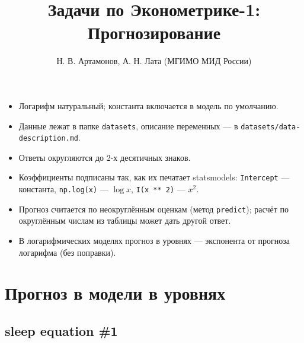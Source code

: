 \documentclass[
  russian,
]{article}
\title{Задачи по Эконометрике-1: Прогнозирование}
\author{Н. В. Артамонов, А. Н. Лата (МГИМО МИД России)}
\date{}
\providecommand{\tightlist}{%
  \setlength{\itemsep}{0pt}\setlength{\parskip}{0pt}}
\renewcommand*\contentsname{Содержание}
\newcommand\contentsname{Содержание}
\begin{document}
\maketitle

\renewcommand*\contentsname{Содержание}
{
\setcounter{tocdepth}{3}
\tableofcontents
}

\begin{tcolorbox}[enhanced jigsaw, arc=.35mm, bottomrule=.15mm, bottomtitle=1mm, breakable, colback=white, colbacktitle=quarto-callout-important-color!10!white, colframe=quarto-callout-important-color-frame, coltitle=black, left=2mm, leftrule=.75mm, opacityback=0, opacitybacktitle=0.6, rightrule=.15mm, title=\textcolor{quarto-callout-important-color}{\faExclamation}\hspace{0.5em}{Важно}, titlerule=0mm, toprule=.15mm, toptitle=1mm]

\begin{itemize}
\tightlist
\item
  Логарифм натуральный; константа включается в модель по умолчанию.
\item
  Данные лежат в папке \texttt{datasets}, описание переменных --- в
  \texttt{datasets/data-description.md}.
\item
  Ответы округляются до 2-х десятичных знаков.
\item
  Коэффициенты подписаны так, как их печатает statsmodels:
  \texttt{Intercept} --- константа, \texttt{np.log(x)} --- \(\log x\),
  \texttt{I(x\ **\ 2)} --- \(x^2\).
\item
  Прогноз считается по неокруглённым оценкам (метод \texttt{predict});
  расчёт по округлённым числам из таблицы может дать другой ответ.
\item
  В логарифмических моделях прогноз в уровнях --- экспонента от прогноза
  логарифма (без поправки).
\end{itemize}

\end{tcolorbox}

\section{Прогноз в модели в
уровнях}\label{ux43fux440ux43eux433ux43dux43eux437-ux432-ux43cux43eux434ux435ux43bux438-ux432-ux443ux440ux43eux432ux43dux44fux445}

\subsection{sleep equation \#1}\label{sleep-equation-1}
\end{document}
